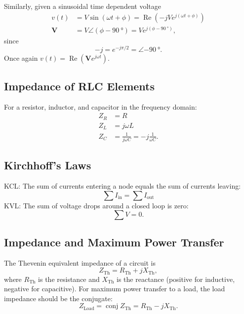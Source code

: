 \documentclass[letterpaper]{scrartcl}
\newcommand{\lr}[1]{\left(#1\right)}
\DeclareMathOperator{\Real}{Re}
\DeclareMathOperator{\conj}{conj}
\newcommand{\phasor}[1]{\mathbf{#1}}
\newcommand{\thev}[0]{\mathrm{Th}}
\newcommand{\load}[0]{\mathrm{Load}}
\begin{document}
Similarly, given a sinusoidal time dependent voltage
\begin{equation}\label{eqn:karlCircuitsCheatSheet:320}
\begin{aligned}
v(t)       &= V \sin\lr{ \omega t + \phi }            = \Real \lr{ -j V e^{j\lr{ \omega t + \phi } } } \\
\phasor{V} &= V \angle \lr{ \phi - \SI{90}{\degree}}  = V e^{j \lr{ \phi - \SI{90}{\degree}} },
\end{aligned}
\end{equation}
since
\begin{equation}\label{eqn:karlCircuitsCheatSheet:400}
-j = e^{-j \pi/2} = \angle \SI{-90}{\degree}.
\end{equation}
Once again \( v(t) = \Real \lr{ \phasor{V} e^{j \omega t} } \).

\subsection*{Impedance of RLC Elements}
For a resistor, inductor, and capacitor in the frequency domain:
\begin{equation}\label{eqn:karlCircuitsCheatSheet:460}
\begin{aligned}
Z_R &= R \\
Z_L &= j \omega L \\
Z_C &= \frac{1}{j \omega C} = -j \frac{1}{\omega C}.
\end{aligned}
\end{equation}

\subsection*{Kirchhoff's Laws}
KCL: The sum of currents entering a node equals the sum of currents leaving:
\begin{equation}\label{eqn:karlCircuitsCheatSheet:480}
\sum I_{\text{in}} = \sum I_{\text{out}}
\end{equation}
KVL: The sum of voltage drops around a closed loop is zero:
\begin{equation}\label{eqn:karlCircuitsCheatSheet:500}
\sum V = 0.
\end{equation}

\subsection*{Impedance and Maximum Power Transfer}
The Thevenin equivalent impedance of a circuit is
\begin{equation}\label{eqn:karlCircuitsCheatSheet:340}
Z_\thev = R_\thev + j X_\thev,
\end{equation}
where \( R_\thev \) is the resistance and \( X_\thev \) is the reactance (positive for inductive, negative for capacitive). For maximum power transfer to a load, the load impedance should be the conjugate:
\begin{equation}\label{eqn:karlCircuitsCheatSheet:360}
Z_\load = \conj{Z_\thev} = R_\thev - j X_\thev.
\end{equation}
\end{document}
